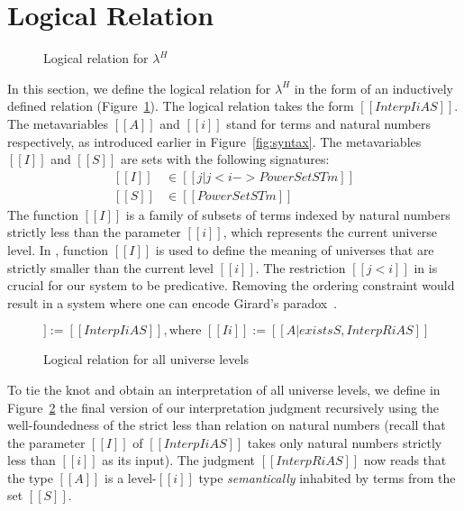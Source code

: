 \documentclass[acmsmall]{acmart}
\newcommand{\lang}{$\lambda^H$\xspace}
\begin{document}
\section{Logical Relation}
\label{sec:logreldep}
\begin{figure}[h]
\caption{Logical relation for \lang}
\label{fig:logrel}
\end{figure}
In this section, we define the logical relation for \lang{} in the
form of an inductively defined relation (Figure~\ref{fig:logrel}). The
logical relation takes the form $[[Interp I i A S]]$. The
metavariables $[[A]]$ and $[[i]]$ stand for terms and natural
numbers respectively, as introduced earlier in
Figure~\ref{fig:syntax}.
The metavariables $[[I]]$ and $[[S]]$ are
sets with the following signatures:
\begin{equation*}
  \begin{split}
    [[I]] &\in [[ { j | j < i  } ->  PowerSet STm ]] \\
    [[S]] &\in [[PowerSet STm]]
  \end{split}
\end{equation*}
The function $[[I]]$ is a family of subsets of terms indexed by
natural numbers strictly less than the parameter $[[i]]$, which
represents the current universe level.  In , function
$[[I]]$ is used to define the meaning of
universes that are strictly smaller than the current level $[[i]]$. The
restriction $[[j < i]]$ in  is crucial for our system to
be predicative. Removing the ordering constraint would result in a
system where one can encode Girard's paradox~\citep{girard-thesis}.

\begin{figure}[h]
\begin{equation*}
    [[InterpR i A S]] := [[ Interp I i A S  ]], \text{where } [[I i]] := [[{A | exists S , InterpR i A S}]]
\end{equation*}
\caption{Logical relation for all universe levels}
\label{fig:logrelrec}
\end{figure}
To tie the knot and obtain an interpretation of all universe levels,
we define in Figure~\ref{fig:logrelrec} the final version of our interpretation judgment recursively
using the well-foundedness of the strict less than relation on natural
numbers (recall that
the parameter $[[I]]$ of $[[Interp I i A S]]$ takes only natural
numbers strictly less than $[[i]]$ as its input).
The judgment $[[InterpR i A S]]$ now reads that the type $[[A]]$ is a
level-$[[i]]$ type \emph{semantically} inhabited by terms from the set
$[[S]]$.
\end{document}
